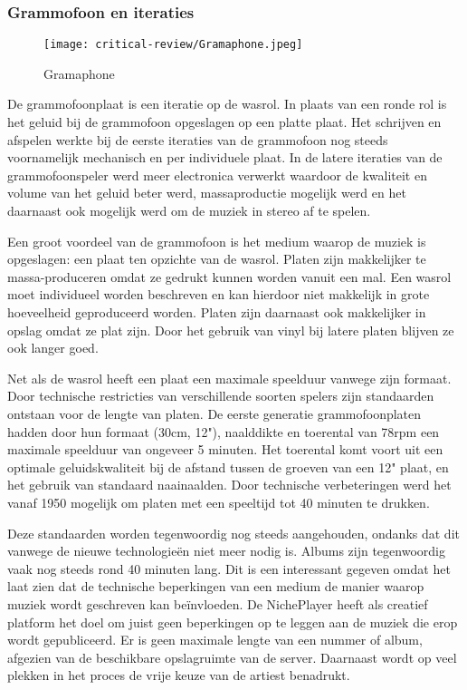 

\subsubsection*{Grammofoon en iteraties}
\begin{wrapfigure}{r}{0.25\textwidth}
    \centering
    \texttt{[image: critical-review/Gramaphone.jpeg]}
    \caption{Gramaphone}
    \label{fig:critical-review:Gramaphone}
\end{wrapfigure}
De grammofoonplaat is een iteratie op de wasrol. In plaats van een ronde rol is het geluid bij de grammofoon opgeslagen op een platte plaat. Het schrijven en afspelen werkte bij de eerste iteraties van de grammofoon nog steeds voornamelijk mechanisch en per individuele plaat. In de latere iteraties van de grammofoonspeler werd meer electronica verwerkt waardoor de kwaliteit en volume van het geluid beter werd, massaproductie mogelijk werd en het daarnaast ook mogelijk werd om de muziek in stereo af te spelen.

Een groot voordeel van de grammofoon is het medium waarop de muziek is opgeslagen: een plaat ten opzichte van de wasrol. Platen zijn makkelijker te massa-produceren omdat ze gedrukt kunnen worden vanuit een mal. Een wasrol moet individueel worden beschreven en kan hierdoor niet makkelijk in grote hoeveelheid geproduceerd worden. Platen zijn daarnaast ook makkelijker in opslag omdat ze plat zijn. Door het gebruik van vinyl bij latere platen blijven ze ook langer goed.

Net als de wasrol heeft een plaat een maximale speelduur vanwege zijn formaat. Door technische restricties van verschillende soorten spelers zijn standaarden ontstaan voor de lengte van platen. De eerste generatie grammofoonplaten hadden door hun formaat (30cm, 12"), naalddikte en toerental van 78rpm een maximale speelduur van ongeveer 5 minuten. Het toerental komt voort uit een optimale geluidskwaliteit bij de afstand tussen de groeven van een 12" plaat, en het gebruik van standaard naainaalden. Door technische verbeteringen werd het vanaf 1950 mogelijk om platen met een speeltijd tot 40 minuten te drukken. 

Deze standaarden worden tegenwoordig nog steeds aangehouden, ondanks dat dit vanwege de nieuwe technologieën niet meer nodig is. Albums zijn tegenwoordig vaak nog steeds rond 40 minuten lang. Dit is een interessant gegeven omdat het laat zien dat de technische beperkingen van een medium de manier waarop muziek wordt geschreven kan beïnvloeden. De NichePlayer heeft als creatief platform het doel om juist geen beperkingen op te leggen aan de muziek die erop wordt gepubliceerd. Er is geen maximale lengte van een nummer of album, afgezien van de beschikbare opslagruimte van de server. Daarnaast wordt op veel plekken in het proces de vrije keuze van de artiest benadrukt.

